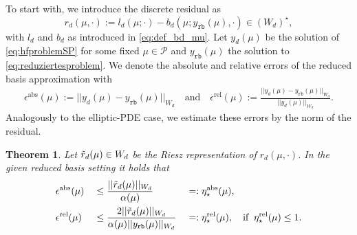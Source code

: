 \documentclass{article}
\theoremstyle{plain}
\newtheorem{theorem}{Theorem}[section]
\theoremstyle{definition}
\theoremstyle{remark}
\newcommand{\RBestFineABS}{\eta_\star^\text{abs}}
\newcommand{\RBestFineREL}{\eta_\star^\text{rel}}
\begin{document}
\noindent To start with, we introduce the discrete residual as
\begin{equation}
    r_d(\mu, \cdot) := l_d(\mu; \cdot) - b_d(\mu; y_\texttt{rb}(\mu), \cdot) \in (W_d)^\star,
\end{equation}
with $l_d$ and $b_d$ as introduced in \eqref{eq:def_bd_mu}. Let $y_d(\mu)$ be the solution of \eqref{eq:hfproblemSP} for some fixed $\mu \in \mathcal{P}$ and $y_\texttt{rb}(\mu)$ the solution to \eqref{eq:reduziertesproblem}. We denote the absolute and relative errors of the reduced basis approximation with 
\begin{align}
    \epsilon^\text{abs}(\mu) := \vert \vert y_{d}(\mu) - y_{\texttt{rb}}(\mu) \vert \vert _{W_d} \quad \text{and} \quad \epsilon^\text{rel}(\mu) := \frac{\vert \vert y_{d}(\mu) - y_{\texttt{rb}}(\mu) \vert \vert _{W_d}}{\vert \vert y_{d}(\mu) \vert \vert _{W_d}} .
\end{align}
Analogously to the elliptic-PDE case, we estimate these errors by the norm of the residual.
\begin{theorem}\label{thm:RBerror_ex}
Let $\Tilde{r}_d(\mu) \in W_d$ be the Riesz representation of $r_d(\mu, \cdot)$. In the given reduced basis setting it holds that
\begin{alignat}{3} \label{eq:RB_first_abs_est}
    &\epsilon^\text{abs}(\mu) &&\leq \frac{\vert \vert \Tilde{r}_d(\mu) \vert \vert _{W_d}}{\alpha(\mu)} &&=: \RBestFineABS(\mu), \\
    &\epsilon^\text{rel}(\mu) &&\leq \frac{2\vert \vert \Tilde{r}_d(\mu) \vert \vert _{W_d}}{\alpha(\mu)\vert \vert y_{\texttt{rb}}(\mu) \vert \vert _{W_d}} &&=: \RBestFineREL(\mu), \quad \text{if} \; \; \RBestFineREL(\mu) \leq 1 . \label{eq:RB_first_rel_est}
\end{alignat}
\end{theorem}
\end{document}
